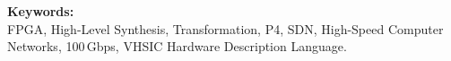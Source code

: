 \bigskip

\noindent\textbf{Keywords:}\\
\indent FPGA, High-Level Synthesis, Transformation, P4, SDN, High-Speed Computer Networks, 100\,Gbps, VHSIC Hardware Description Language.



